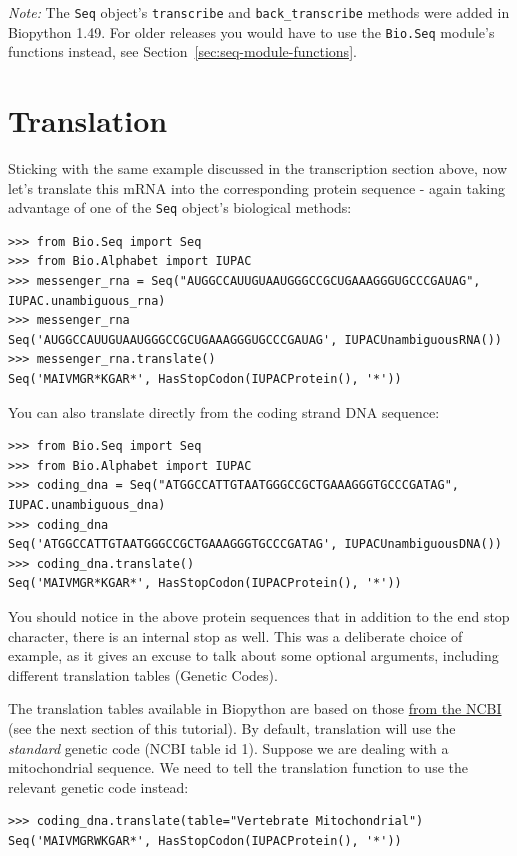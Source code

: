 \documentclass{report}
\begin{document}
\emph{Note:} The \verb|Seq| object's \verb|transcribe| and \verb|back_transcribe| methods
were added in Biopython 1.49.  For older releases you would have to use the \verb|Bio.Seq|
module's functions instead, see Section~\ref{sec:seq-module-functions}.

\section{Translation}
\label{sec:translation}
Sticking with the same example discussed in the transcription section above,
now let's translate this mRNA into the corresponding protein sequence - again taking
advantage of one of the \verb|Seq| object's biological methods:

\begin{verbatim}
>>> from Bio.Seq import Seq
>>> from Bio.Alphabet import IUPAC
>>> messenger_rna = Seq("AUGGCCAUUGUAAUGGGCCGCUGAAAGGGUGCCCGAUAG", IUPAC.unambiguous_rna)
>>> messenger_rna
Seq('AUGGCCAUUGUAAUGGGCCGCUGAAAGGGUGCCCGAUAG', IUPACUnambiguousRNA())
>>> messenger_rna.translate()
Seq('MAIVMGR*KGAR*', HasStopCodon(IUPACProtein(), '*'))
\end{verbatim}

You can also translate directly from the coding strand DNA sequence:
\begin{verbatim}
>>> from Bio.Seq import Seq
>>> from Bio.Alphabet import IUPAC
>>> coding_dna = Seq("ATGGCCATTGTAATGGGCCGCTGAAAGGGTGCCCGATAG", IUPAC.unambiguous_dna)
>>> coding_dna
Seq('ATGGCCATTGTAATGGGCCGCTGAAAGGGTGCCCGATAG', IUPACUnambiguousDNA())
>>> coding_dna.translate()
Seq('MAIVMGR*KGAR*', HasStopCodon(IUPACProtein(), '*'))
\end{verbatim}

You should notice in the above protein sequences that in addition to the end stop character, there is an internal stop as well.  This was a deliberate choice of example, as it gives an excuse to talk about some optional arguments, including different translation tables (Genetic Codes).

The translation tables available in Biopython are based on those \href{http://www.ncbi.nlm.nih.gov/Taxonomy/Utils/wprintgc.cgi}{from the NCBI} (see the next section of this tutorial).  By default, translation will use the \emph{standard} genetic code (NCBI table id 1).
Suppose we are dealing with a mitochondrial sequence.  We need to tell the translation function to use the relevant genetic code instead:
\begin{verbatim}
>>> coding_dna.translate(table="Vertebrate Mitochondrial")
Seq('MAIVMGRWKGAR*', HasStopCodon(IUPACProtein(), '*'))
\end{verbatim}
\end{document}
